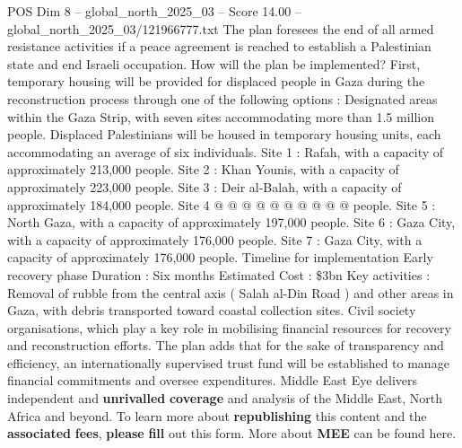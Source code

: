 \begin{textsample}{POS Dim 8 – global\_north\_2025\_03 – Score 14.00 – global\_north\_2025\_03/121966777.txt}
The plan foresees the end of all armed resistance activities if a peace agreement is reached to establish a Palestinian state and end Israeli occupation.
How will the plan be implemented?
First, temporary housing will be provided for displaced people in Gaza during the reconstruction process through one of the following options : Designated areas within the Gaza Strip, with seven sites accommodating more than 1.5 million people.
Displaced Palestinians will be housed in temporary housing units, each accommodating an average of six individuals.
Site 1 : Rafah, with a capacity of approximately 213,000 people.
Site 2 : Khan Younis, with a capacity of approximately 223,000 people.
Site 3 : Deir al-Balah, with a capacity of approximately 184,000 people.
Site 4 @ @ @ @ @ @ @ @ @ @ people.
Site 5 : North Gaza, with a capacity of approximately 197,000 people.
Site 6 : Gaza City, with a capacity of approximately 176,000 people.
Site 7 : Gaza City, with a capacity of approximately 176,000 people.
Timeline for implementation Early recovery phase Duration : Six months Estimated Cost : \$3bn Key activities : Removal of rubble from the central axis ( Salah al-Din Road ) and other areas in Gaza, with debris transported toward coastal collection sites.
Civil society organisations, which play a key role in mobilising financial resources for recovery and reconstruction efforts.
The plan adds that for the sake of transparency and efficiency, an internationally supervised trust fund will be established to manage financial commitments and oversee expenditures.
Middle East Eye delivers independent and \textbf{unrivalled} \textbf{coverage} and analysis of the Middle East, North Africa and beyond.
To learn more about \textbf{republishing} this content and the \textbf{associated} \textbf{fees}, \textbf{please} \textbf{fill} out this form.
More about \textbf{MEE} can be found here.

\end{textsample}
